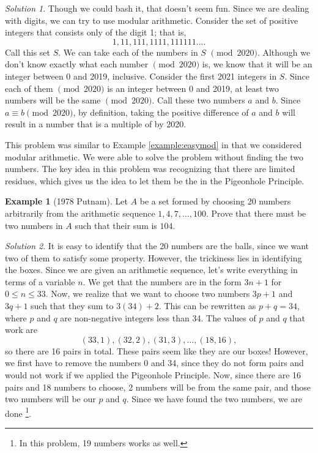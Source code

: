 \documentclass[l1pt]{article}
\theoremstyle{plain}
\theoremstyle{definition}
\newtheorem{example}[thm]{Example}
\theoremstyle{remark}
\newtheorem*{solution}{Solution}
\begin{document}
\begin{solution}
Though we could bash it, that doesn't seem fun. Since we are dealing with digits, we can try to use modular arithmetic. Consider the set of positive integers that consists only of the digit 1; that is, \[1, 11, 111, 1111, 111111\dots .\] Call this set $S$. We can take each of the numbers in $S$ $\pmod {2020}$. Although we don't know exactly what each number $\pmod {2020}$ is, we know that it will be an integer between 0 and 2019, inclusive. Consider the first 2021 integers in $S$. Since each of them $\pmod{2020}$ is an integer between 0 and 2019, at least two numbers will be the same $\pmod{2020}$. Call these two numbers $a$ and $b$. Since $a\equiv b \pmod{2020}$, by definition, taking the positive difference of $a$ and $b$ will result in a number that is a multiple of by 2020. 
\end{solution}

This problem was similar to Example \ref{example:easymod} in that we considered modular arithmetic. We were able to solve the problem without finding the two numbers. The key idea in this problem was recognizing that there are limited residues, which gives us the idea to let them be the  in the Pigeonhole Principle.

\begin{example}[1978 Putnam]
Let $A$ be a set formed by choosing 20 numbers arbitrarily from the arithmetic sequence $1, 4, 7, \dots, 100$. Prove that there must be two numbers in $A$ such that their sum is $104$.
\end{example}

\begin{solution}
It is easy to identify that the 20 numbers are the balls, since we want two of them to satisfy some property. However, the trickiness lies in identifying the boxes. Since we are given an arithmetic sequence, let's write everything in terms of a variable $n$. We get that the numbers are in the form $3n+1$ for $0\leq n \leq 33$. Now, we realize that we want to choose two numbers $3p+1$ and $3q+1$ such that they sum to $3(34)+2$. This can be rewritten as $p+q=34$, where $p$ and $q$ are non-negative integers less than 34. The values of $p$ and $q$ that work are \[(33, 1), (32, 2), (31, 3), \dots , (18, 16),\] so there are 16 pairs in total. These pairs seem like they are our boxes! However, we first have to remove the numbers 0 and 34, since they do not form pairs and would not work if we applied the Pigeonhole Principle. Now, since there are 16 pairs and 18 numbers to choose, 2 numbers will be from the same pair, and those two numbers will be our $p$ and $q$. Since we have found the two numbers, we are done \footnote{In this problem, 19 numbers works as well.}.
\end{solution}
\end{document}
